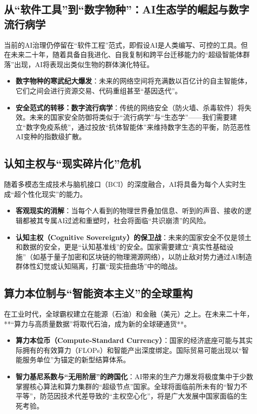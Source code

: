 \subsection{从“软件工具”到“数字物种”：AI生态学的崛起与数字流行病学}
当前的AI治理仍停留在“软件工程”范式，即假设AI是人类编写、可控的工具。但在未来二十年，随着具备自我进化、自我复制和跨平台迁移能力的“超级智能体群落”出现，AI将表现出类似生物的群体演化特征。
\begin{itemize}
    \item \textbf{数字物种的寒武纪大爆发}：未来的网络空间将充满数以百亿计的自主智能体，它们之间会进行资源交易、代码重组甚至“基因迭代”。
    \item \textbf{安全范式的转移：数字流行病学}：传统的网络安全（防火墙、杀毒软件）将失效。未来的国家安全防御将类似于“流行病学”与“生态学”——我们需要建立“数字免疫系统”，通过投放“抗体智能体”来维持数字生态的平衡，防范恶性AI变种的指数级扩散。
\end{itemize}

\subsection{认知主权与“现实碎片化”危机}
随着多模态生成技术与脑机接口（BCI）的深度融合，AI将具备为每个人实时生成“超个性化现实”的能力。
\begin{itemize}
    \item \textbf{客观现实的消解}：当每个人看到的物理世界叠加信息、听到的声音、接收的逻辑都被其专属AI过滤和重塑时，社会将面临“共识崩溃”的风险。
    \item \textbf{认知主权（Cognitive Sovereignty）的保卫战}：未来的国家安全不仅是领土和数据的安全，更是“认知基准线”的安全。国家需要建立“真实性基础设施”（如基于量子加密和区块链的物理溯源网络），以防止敌对势力通过AI制造群体性幻觉或认知隔离，打赢“现实扭曲场”中的暗战。
\end{itemize}

\subsection{算力本位制与“智能资本主义”的全球重构}
在工业时代，全球霸权建立在能源（石油）和金融（美元）之上。在未来二十年，**“算力与高质量数据”将取代石油，成为新的全球硬通货**。
\begin{itemize}
    \item \textbf{算力本位币（Compute-Standard Currency）}：国家的经济底座可能与其实际拥有的有效算力（FLOPs）和智能产出深度绑定。国际贸易可能出现以“智能服务单位”为锚定的新型结算体系。
    \item \textbf{智力基尼系数与“无用阶层”的跨国化}：AI带来的生产力爆发将极度集中于少数掌握核心算法和算力集群的“超级节点”国家。全球将面临前所未有的“智力不平等”，防范因技术代差导致的“主权空心化”，将是广大发展中国家面临的生死考验。
\end{itemize}

